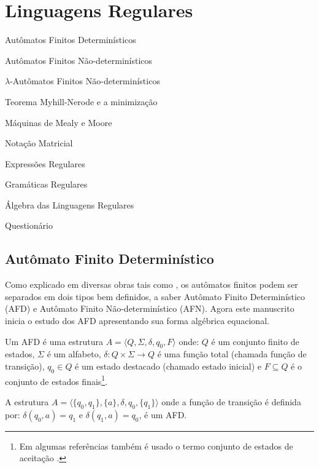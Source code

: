 \chapter{Linguagens Regulares}\label{cap:LinguagemRegulares}

\begin{introduction}[Conteúdos]
	\item Autômatos Finitos Determinísticos
	\item Autômatos Finitos Não-determinísticos
	\item $\lambda$-Autômatos Finitos Não-determinísticos
	\item Teorema Myhill-Nerode e a  minimização
	\item Máquinas de Mealy e Moore
	\item Notação Matricial
	\item Expressões Regulares
	\item Gramáticas Regulares
	\item Álgebra das Linguagens Regulares
	\item Questionário
\end{introduction}

\section{Autômato Finito Determinístico}\label{sec:AFD}

Como explicado em diversas obras tais como \cite{benjaLivro2010, hopcroft2008, linz2006, menezes1998LFA}, os autômatos finitos podem ser separados em dois tipos bem definidos, a saber Autômato Finito Determinístico (AFD) e Autômato Finito Não-determinístico (AFN). Agora este manuscrito inicia o estudo dos AFD apresentando sua forma algébrica equacional.

\begin{definition}\label{def:AFD}
	Um AFD é uma estrutura $A = \langle Q, \Sigma, \delta, q_0, F\rangle$ onde: $Q$ é um conjunto finito de estados, $\Sigma$ é um alfabeto, $\delta : Q \times \Sigma \rightarrow Q$ é uma função total (chamada função de transição), $q_0 \in Q$ é um estado destacado (chamado estado inicial) e $F \subseteq Q$ é o conjunto de estados finais\footnote{Em algumas referências também é usado o termo conjunto de estados de aceitação \cite{de2010}.}.
\end{definition}

\begin{example}\label{exe:AFD}
	A estrutura $A = \langle \{q_0, q_1\}, \{a\}, \delta, q_0, \{q_1\} \rangle$ onde a função de transição é definida por: $\delta(q_0, a) = q_1$ e $\delta(q_1, a) = q_0$, é um AFD.
\end{example}

